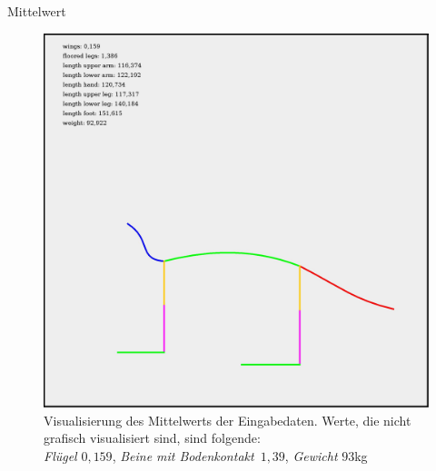 \documentclass{beamer}
\begin{document}
\begin{frame}{Mittelwert}
 \begin{figure}
  \centering
  \includegraphics[height=0.6\textheight]{../../PCA/mean_log_weight_downscaled_wings_legs_and_weight(onlyBox,stroke4).jpg}
  \caption{Visualisierung des Mittelwerts der Eingabedaten. Werte, die nicht grafisch visualisiert sind, sind folgende:\\\emph{Flügel} $0{,}159$, \emph{Beine mit Bodenkontakt}~$1{,}39$, \emph{Gewicht} $93$kg}
 \end{figure}
\end{frame}
\end{document}
